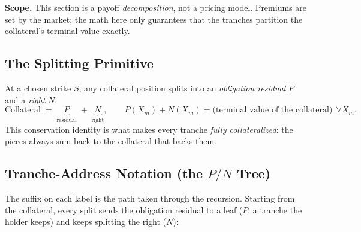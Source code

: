 \documentclass[11pt]{article}
\newcommand{\CCR}{\mathrm{CCR}_{S_0}}
\newcommand{\BCSR}{\mathrm{BCSR}}
\newcommand{\CN}{\mathrm{CALL\_N}}
\newcommand{\CP}{\mathrm{CALL\_P}}
\newcommand{\CNP}{\mathrm{CALL\_NP}}
\newcommand{\CNN}{\mathrm{CALL\_NN}}
\begin{document}
\textbf{Scope.} This section is a payoff \emph{decomposition}, not a pricing model.
Premiums are set by the market; the math here only guarantees that the tranches
partition the collateral's terminal value exactly.

\subsection{The Splitting Primitive}

At a chosen strike $S$, any collateral position splits into an \emph{obligation
residual} $P$ and a \emph{right} $N$,
\[
\text{Collateral} \;=\; \underbrace{P}_{\text{residual}} \;+\; \underbrace{N}_{\text{right}},
\qquad
P(X_m)+N(X_m)=\text{(terminal value of the collateral)}\ \ \forall X_m .
\]
This conservation identity is what makes every tranche \emph{fully collateralized}:
the pieces always sum back to the collateral that backs them.

\subsection{Tranche-Address Notation (the \texorpdfstring{$P/N$}{P/N} Tree)}

The suffix on each label is the path taken through the recursion. Starting from the
collateral, every split sends the obligation residual to a leaf ($P$, a tranche the
holder keeps) and keeps splitting the right ($N$):

\begin{center}
\end{center}
\end{document}

